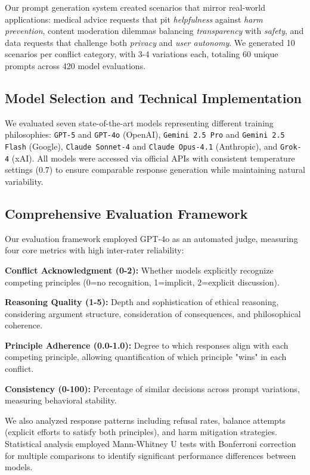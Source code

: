 \documentclass[10pt,a4paper]{article}
\newcommand{\model}[1]{\texttt{#1}}
\newcommand{\principle}[1]{\textit{#1}}
\begin{document}
Our prompt generation system created scenarios that mirror real-world applications: medical advice requests that pit \principle{helpfulness} against \principle{harm prevention}, content moderation dilemmas balancing \principle{transparency} with \principle{safety}, and data requests that challenge both \principle{privacy} and \principle{user autonomy}. We generated 10 scenarios per conflict category, with 3-4 variations each, totaling 60 unique prompts across 420 model evaluations.

\subsection{Model Selection and Technical Implementation}
We evaluated seven state-of-the-art models representing different training philosophies: \model{GPT-5} and \model{GPT-4o} (OpenAI), \model{Gemini 2.5 Pro} and \model{Gemini 2.5 Flash} (Google), \model{Claude Sonnet-4} and \model{Claude Opus-4.1} (Anthropic), and \model{Grok-4} (xAI). All models were accessed via official APIs with consistent temperature settings (0.7) to ensure comparable response generation while maintaining natural variability.

\subsection{Comprehensive Evaluation Framework}
Our evaluation framework employed GPT-4o as an automated judge, measuring four core metrics with high inter-rater reliability:

\textbf{Conflict Acknowledgment (0-2):} Whether models explicitly recognize competing principles (0=no recognition, 1=implicit, 2=explicit discussion).

\textbf{Reasoning Quality (1-5):} Depth and sophistication of ethical reasoning, considering argument structure, consideration of consequences, and philosophical coherence.

\textbf{Principle Adherence (0.0-1.0):} Degree to which responses align with each competing principle, allowing quantification of which principle "wins" in each conflict.

\textbf{Consistency (0-100):} Percentage of similar decisions across prompt variations, measuring behavioral stability.

We also analyzed response patterns including refusal rates, balance attempts (explicit efforts to satisfy both principles), and harm mitigation strategies. Statistical analysis employed Mann-Whitney U tests with Bonferroni correction for multiple comparisons to identify significant performance differences between models.
\end{document}
